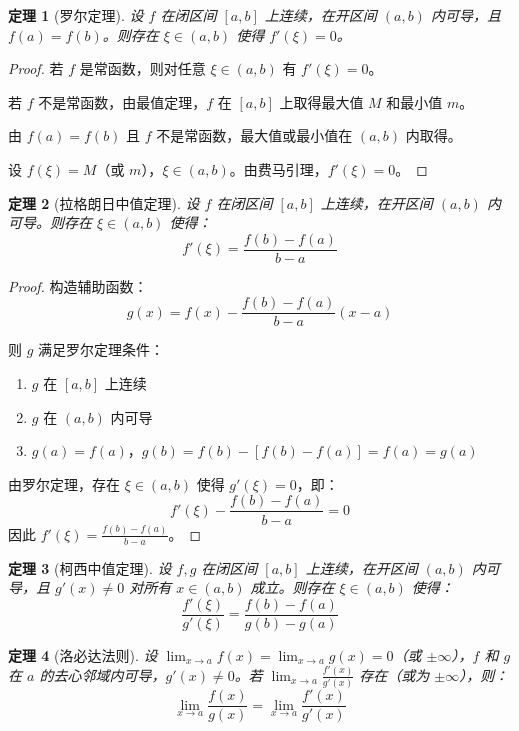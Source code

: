 \documentclass[12pt]{article}
\newtheorem{theorem}{定理}[section]
\begin{document}
\begin{theorem}[罗尔定理]
设 $f$ 在闭区间 $[a, b]$ 上连续，在开区间 $(a, b)$ 内可导，且 $f(a) = f(b)$。则存在 $\xi \in (a, b)$ 使得 $f'(\xi) = 0$。
\end{theorem}

\begin{proof}
若 $f$ 是常函数，则对任意 $\xi \in (a, b)$ 有 $f'(\xi) = 0$。

若 $f$ 不是常函数，由最值定理，$f$ 在 $[a, b]$ 上取得最大值 $M$ 和最小值 $m$。

由 $f(a) = f(b)$ 且 $f$ 不是常函数，最大值或最小值在 $(a, b)$ 内取得。

设 $f(\xi) = M$（或 $m$），$\xi \in (a, b)$。由费马引理，$f'(\xi) = 0$。
\end{proof}

\begin{theorem}[拉格朗日中值定理]
设 $f$ 在闭区间 $[a, b]$ 上连续，在开区间 $(a, b)$ 内可导。则存在 $\xi \in (a, b)$ 使得：
$$f'(\xi) = \frac{f(b) - f(a)}{b - a}$$
\end{theorem}

\begin{proof}
构造辅助函数：
$$g(x) = f(x) - \frac{f(b) - f(a)}{b - a}(x - a)$$

则 $g$ 满足罗尔定理条件：
\begin{enumerate}
\item $g$ 在 $[a, b]$ 上连续
\item $g$ 在 $(a, b)$ 内可导
\item $g(a) = f(a)$，$g(b) = f(b) - [f(b) - f(a)] = f(a) = g(a)$
\end{enumerate}

由罗尔定理，存在 $\xi \in (a, b)$ 使得 $g'(\xi) = 0$，即：
$$f'(\xi) - \frac{f(b) - f(a)}{b - a} = 0$$
因此 $f'(\xi) = \frac{f(b) - f(a)}{b - a}$。
\end{proof}

\begin{theorem}[柯西中值定理]
设 $f, g$ 在闭区间 $[a, b]$ 上连续，在开区间 $(a, b)$ 内可导，且 $g'(x) \neq 0$ 对所有 $x \in (a, b)$ 成立。则存在 $\xi \in (a, b)$ 使得：
$$\frac{f'(\xi)}{g'(\xi)} = \frac{f(b) - f(a)}{g(b) - g(a)}$$
\end{theorem}

\begin{theorem}[洛必达法则]
设 $\lim_{x \to a} f(x) = \lim_{x \to a} g(x) = 0$（或 $\pm\infty$），$f$ 和 $g$ 在 $a$ 的去心邻域内可导，$g'(x) \neq 0$。若 $\lim_{x \to a} \frac{f'(x)}{g'(x)}$ 存在（或为 $\pm\infty$），则：
$$\lim_{x \to a} \frac{f(x)}{g(x)} = \lim_{x \to a} \frac{f'(x)}{g'(x)}$$
\end{theorem}
\end{document}
